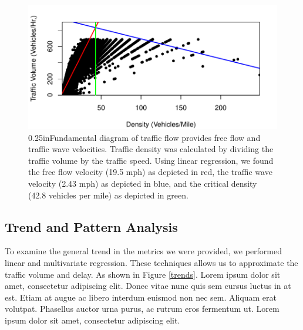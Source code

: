 \documentclass{report}
\begin{document}
\begin{figure}[h]
\centering
\includegraphics{upstat_report-003}
\caption{\rightskip0.25inFundamental diagram of traffic flow provides
free flow and traffic wave velocities. Traffic density was calculated by
dividing the traffic volume by the traffic speed. Using linear regression, we
found the free flow velocity (19.5 mph) as depicted in red, the traffic wave
velocity (2.43 mph) as depicted in blue, and the critical density (42.8 vehicles
per mile) as depicted in green.}
\label{fig:Fundamental}
\end{figure}


\subsection*{Trend and Pattern Analysis}

To examine the general trend in the metrics we were provided, we performed linear
and multivariate regression. These techniques allows us to approximate the traffic
volume and delay. As shown in Figure \ref{trends}. Lorem ipsum dolor sit amet,
consectetur adipiscing elit. Donec vitae nunc quis sem cursus luctus in at est.
Etiam at augue ac libero interdum euismod non nec sem. Aliquam erat volutpat.
Phasellus auctor urna purus, ac rutrum eros fermentum ut. Lorem ipsum dolor sit
amet, consectetur adipiscing elit.
\end{document}
